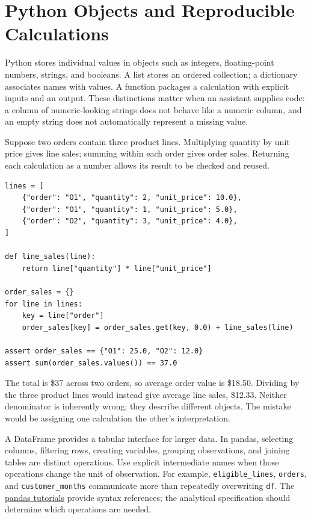 \hypertarget{M01-python-objects-and-reproducible-calculations}{%
\section{Python Objects and Reproducible
Calculations}\label{M01-python-objects-and-reproducible-calculations}}

\noindent Python stores individual values in objects such as integers,
floating-point numbers, strings, and booleans. A list stores an ordered
collection; a dictionary associates names with values. A function
packages a calculation with explicit inputs and an output. These
distinctions matter when an assistant supplies code: a column of
numeric-looking strings does not behave like a numeric column, and an
empty string does not automatically represent a missing value.

Suppose two orders contain three product lines. Multiplying quantity by
unit price gives line sales; summing within each order gives order
sales. Returning each calculation as a number allows its result to be
checked and reused.

\begin{Verbatim}[breaklines,breakanywhere,fontsize=\small]
lines = [
    {"order": "O1", "quantity": 2, "unit_price": 10.0},
    {"order": "O1", "quantity": 1, "unit_price": 5.0},
    {"order": "O2", "quantity": 3, "unit_price": 4.0},
]

def line_sales(line):
    return line["quantity"] * line["unit_price"]

order_sales = {}
for line in lines:
    key = line["order"]
    order_sales[key] = order_sales.get(key, 0.0) + line_sales(line)

assert order_sales == {"O1": 25.0, "O2": 12.0}
assert sum(order_sales.values()) == 37.0
\end{Verbatim}

The total is \$37 across two orders, so average order value is \$18.50.
Dividing by the three product lines would instead give average line
sales, \$12.33. Neither denominator is inherently wrong; they describe
different objects. The mistake would be assigning one calculation the
other's interpretation.

A DataFrame provides a tabular interface for larger data. In pandas,
selecting columns, filtering rows, creating variables, grouping
observations, and joining tables are distinct operations. Use explicit
intermediate names when those operations change the unit of observation.
For example, \texttt{eligible\_lines}, \texttt{orders}, and
\texttt{customer\_months} communicate more than repeatedly overwriting
\texttt{df}. The
\href{https://pandas.pydata.org/docs/getting_started/intro_tutorials/}{pandas
tutorials} provide syntax references; the analytical specification
should determine which operations are needed.

